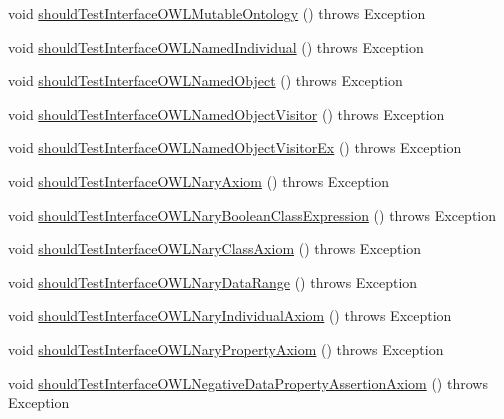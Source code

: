 \begin{DoxyCompactItemize}
void \hyperlink{classorg_1_1semanticweb_1_1owlapi_1_1contract_1_1_contract_owlapi_model__2_test_a5654a9cb7c272b419d416a1f64b33504}{should\-Test\-Interface\-O\-W\-L\-Mutable\-Ontology} ()  throws Exception 
\item 
void \hyperlink{classorg_1_1semanticweb_1_1owlapi_1_1contract_1_1_contract_owlapi_model__2_test_a5e38051e98163364578b742042f310f3}{should\-Test\-Interface\-O\-W\-L\-Named\-Individual} ()  throws Exception 
\item 
void \hyperlink{classorg_1_1semanticweb_1_1owlapi_1_1contract_1_1_contract_owlapi_model__2_test_a12f4078bb72be1e9433e1ea8dc6e786b}{should\-Test\-Interface\-O\-W\-L\-Named\-Object} ()  throws Exception 
\item 
void \hyperlink{classorg_1_1semanticweb_1_1owlapi_1_1contract_1_1_contract_owlapi_model__2_test_a317cf52dd4deafbdf7ad917f64804bc4}{should\-Test\-Interface\-O\-W\-L\-Named\-Object\-Visitor} ()  throws Exception 
\item 
void \hyperlink{classorg_1_1semanticweb_1_1owlapi_1_1contract_1_1_contract_owlapi_model__2_test_a875241c882696499afdef5408cb4f5eb}{should\-Test\-Interface\-O\-W\-L\-Named\-Object\-Visitor\-Ex} ()  throws Exception 
\item 
void \hyperlink{classorg_1_1semanticweb_1_1owlapi_1_1contract_1_1_contract_owlapi_model__2_test_a1fe15eb660e41e9d6ebdaeb74cb585bc}{should\-Test\-Interface\-O\-W\-L\-Nary\-Axiom} ()  throws Exception 
\item 
void \hyperlink{classorg_1_1semanticweb_1_1owlapi_1_1contract_1_1_contract_owlapi_model__2_test_ab3710812ab3c87b40272dbddef535e45}{should\-Test\-Interface\-O\-W\-L\-Nary\-Boolean\-Class\-Expression} ()  throws Exception 
\item 
void \hyperlink{classorg_1_1semanticweb_1_1owlapi_1_1contract_1_1_contract_owlapi_model__2_test_a34e882e1028789b4d73aa0727252a12f}{should\-Test\-Interface\-O\-W\-L\-Nary\-Class\-Axiom} ()  throws Exception 
\item 
void \hyperlink{classorg_1_1semanticweb_1_1owlapi_1_1contract_1_1_contract_owlapi_model__2_test_ac6f44d9ab8e6cd60f56dffe1928877b6}{should\-Test\-Interface\-O\-W\-L\-Nary\-Data\-Range} ()  throws Exception 
\item 
void \hyperlink{classorg_1_1semanticweb_1_1owlapi_1_1contract_1_1_contract_owlapi_model__2_test_ac03405da026cbd99721ec33246b90ed8}{should\-Test\-Interface\-O\-W\-L\-Nary\-Individual\-Axiom} ()  throws Exception 
\item 
void \hyperlink{classorg_1_1semanticweb_1_1owlapi_1_1contract_1_1_contract_owlapi_model__2_test_ab0e0a06bb889799f41eadb07c12494e3}{should\-Test\-Interface\-O\-W\-L\-Nary\-Property\-Axiom} ()  throws Exception 
\item 
void \hyperlink{classorg_1_1semanticweb_1_1owlapi_1_1contract_1_1_contract_owlapi_model__2_test_a9832d3d501755bfc78fee74b0a282860}{should\-Test\-Interface\-O\-W\-L\-Negative\-Data\-Property\-Assertion\-Axiom} ()  throws Exception 
\end{DoxyCompactItemize}


